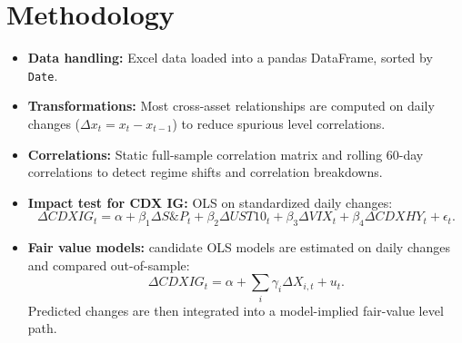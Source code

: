 \section{Methodology}
\begin{itemize}
  \item \textbf{Data handling:} Excel data loaded into a pandas DataFrame, sorted by \texttt{Date}.
  \item \textbf{Transformations:} Most cross-asset relationships are computed on daily changes (\(\Delta x_t = x_t - x_{t-1}\)) to reduce spurious level correlations.
  \item \textbf{Correlations:} Static full-sample correlation matrix and rolling 60-day correlations to detect regime shifts and correlation breakdowns.
  \item \textbf{Impact test for CDX IG:} OLS on standardized daily changes:
  \[
  \Delta CDXIG_t = \alpha + \beta_1 \Delta S\&P_t + \beta_2 \Delta UST10_t + \beta_3 \Delta VIX_t + \beta_4 \Delta CDXHY_t + \epsilon_t.
  \]
  \item \textbf{Fair value models:} candidate OLS models are estimated on daily changes and compared out-of-sample:
  \[
  \Delta CDXIG_t = \alpha + \sum_i \gamma_i \Delta X_{i,t} + u_t.
  \]
  Predicted changes are then integrated into a model-implied fair-value level path.
\end{itemize}
